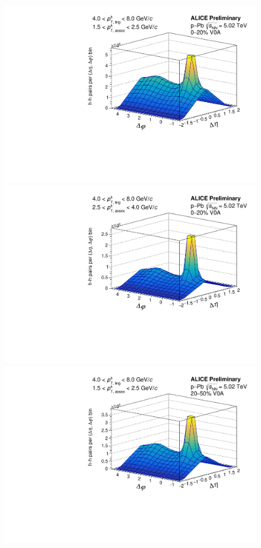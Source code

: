 \begin{figure}[ht]
	\centering
	\begin{minipage}{0.48\textwidth}
		\includegraphics[width=\textwidth]{figures/analysis/h_h_2d_nomixcor_fancy_label_0_20_lowpt.pdf}
	\end{minipage}
	\begin{minipage}{0.48\textwidth}
		\includegraphics[width=\textwidth]{figures/analysis/h_h_2d_nomixcor_fancy_label_0_20_highpt.pdf}
	\end{minipage}
	\begin{minipage}{0.48\textwidth}
		\includegraphics[width=\textwidth]{figures/analysis/h_h_2d_nomixcor_fancy_label_20_50_lowpt.pdf}

\end{minipage}
\end{figure}
